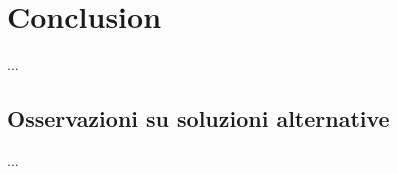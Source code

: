 \documentclass[12pt,a4paper,openright,oneside]{report}
\renewcommand{\chaptermark}[1]{\markboth{\thechapter.\ #1}{}}
\begin{document}
	\section{Conclusion}
	...
	
	\subsection{Osservazioni su soluzioni alternative}
	...
	\renewcommand{\chaptermark}[1]{\markright{\thechapter \ #1}{}}
	\lhead[\fancyplain{}{\bfseries\thepage}]{\fancyplain{}{\bfseries\rightmark}}
	
	
\end{document}
